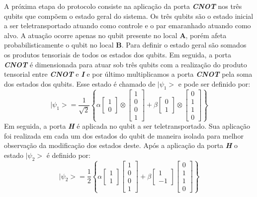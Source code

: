 \documentclass[12pt,oneside,brazil,hidelinks,a4paper]{abntex2}
\begin{document}
\begin{appendices}
    A próxima etapa do protocolo consiste na aplicação da porta
\textbf{\emph{CNOT}} nos três qubits que compõem o estado geral do
sistema. Os três qubits são o estado inicial a ser teletransportado
atuando como controle e o par emaranhado atuando como alvo. A atuação
ocorre apenas no qubit presente no local \textbf{A}, porém afeta
probabilisticamente o qubit no local \textbf{B}. Para definir o estado
geral são somados os produtos tensoriais de todos os estados dos qubits.
Em seguida, a porta \textbf{\emph{CNOT}} é dimensionada para atuar sob
três qubits com a realização do produto tensorial entre
\textbf{\emph{CNOT}} e \textbf{\emph{I}} e por último multiplicamos a
porta \textbf{\emph{CNOT}} pela soma dos estados dos qubits. Esse estado
é chamado de \(|\psi_1>\) e pode ser definido por:
\[ |\psi_1> = \frac{1}{\sqrt2} \left\{ \alpha \begin{bmatrix}
1 \\
0
\end{bmatrix} \otimes  \begin{bmatrix}
1 \\
0 \\
0 \\
1
\end{bmatrix}  + \beta \begin{bmatrix}
0 \\
1
\end{bmatrix} \otimes  \begin{bmatrix}
0 \\
1 \\
1 \\
0
\end{bmatrix}  \right\}
\] Em seguida, a porta \textbf{\emph{H}} é aplicada no qubit a ser
teletransportado. Sua aplicação foi realizada em cada um dos estados do
qubit de maneira isolada para melhor observação da modificação dos
estados deste. Após a aplicação da porta \textbf{\emph{H}} o estado
\(|\psi_2>\) é definido por:
\[|\psi_2> = \frac{1}{2} \left\{ \alpha \begin{bmatrix}
1 \\
1
\end{bmatrix} \begin{bmatrix}
1 \\
0 \\
0 \\
1
\end{bmatrix} + \beta \begin{bmatrix}
1 \\
-1
\end{bmatrix} \begin{bmatrix}
0 \\
1 \\
1 \\
0
\end{bmatrix} \right\}
\]


\end{appendices}
\end{document}

